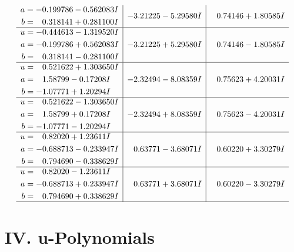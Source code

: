 \documentclass[1p]{elsarticle_modified}
\theoremstyle{definition}
\begin{document}
$$\begin{array}{c|c|c}
\begin{aligned}
a &= -0.199786 - 0.562083 I \\
b &= \phantom{-}0.318141 + 0.281100 I\end{aligned}
 & -3.21225 - 5.29580 I & \phantom{-}0.74146 + 1.80585 I \\ \hline\begin{aligned}
u &= -0.444613 - 1.319520 I \\
a &= -0.199786 + 0.562083 I \\
b &= \phantom{-}0.318141 - 0.281100 I\end{aligned}
 & -3.21225 + 5.29580 I & \phantom{-}0.74146 - 1.80585 I \\ \hline\begin{aligned}
u &= \phantom{-}0.521622 + 1.303650 I \\
a &= \phantom{-}1.58799 - 0.17208 I \\
b &= -1.07771 + 1.20294 I\end{aligned}
 & -2.32494 - 8.08359 I & \phantom{-}0.75623 + 4.20031 I \\ \hline\begin{aligned}
u &= \phantom{-}0.521622 - 1.303650 I \\
a &= \phantom{-}1.58799 + 0.17208 I \\
b &= -1.07771 - 1.20294 I\end{aligned}
 & -2.32494 + 8.08359 I & \phantom{-}0.75623 - 4.20031 I \\ \hline\begin{aligned}
u &= \phantom{-}0.82020 + 1.23611 I \\
a &= -0.688713 - 0.233947 I \\
b &= \phantom{-}0.794690 - 0.338629 I\end{aligned}
 & \phantom{-}0.63771 - 3.68071 I & \phantom{-}0.60220 + 3.30279 I \\ \hline\begin{aligned}
u &= \phantom{-}0.82020 - 1.23611 I \\
a &= -0.688713 + 0.233947 I \\
b &= \phantom{-}0.794690 + 0.338629 I\end{aligned}
 & \phantom{-}0.63771 + 3.68071 I & \phantom{-}0.60220 - 3.30279 I\\
 \hline 
 \end{array}$$\newpage
\newpage\renewcommand{\arraystretch}{1}
\centering \section*{ IV. u-Polynomials}
\end{document}
